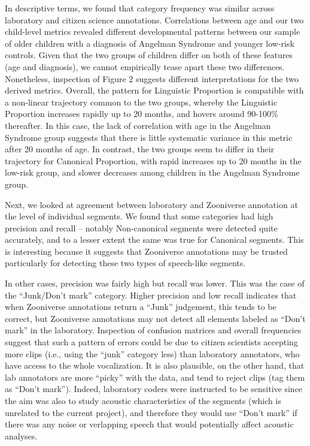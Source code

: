 \documentclass[english,,man,floatsintext]{apa6}
\begin{document}
In descriptive terms, we found that category frequency was similar across laboratory and citizen science annotations. Correlations between age and our two child-level metrics revealed different developmental patterns between our sample of older children with a diagnosis of Angelman Syndrome and younger low-risk controls. Given that the two groups of children differ on both of these features (age and diagnosis), we cannot empirically tease apart these two differences. Nonetheless, inspection of Figure 2 suggests different interpretations for the two derived metrics. Overall, the pattern for Linguistic Proportion is compatible with a non-linear trajectory common to the two groups, whereby the Linguistic Proportion increases rapidly up to 20 months, and hovers around 90-100\% thereafter. In this case, the lack of correlation with age in the Angelman Syndrome group suggests that there is little systematic variance in this metric after 20 months of age. In contrast, the two groups seem to differ in their trajectory for Canonical Proportion, with rapid increases up to 20 months in the low-risk group, and slower decreases among children in the Angelman Syndrome group.

Next, we looked at agreement between laboratory and Zooniverse annotation at the level of individual segments. We found that some categories had high precision and recall -- notably Non-canonical segments were detected quite accurately, and to a lesser extent the same was true for Canonical segments. This is interesting because it suggests that Zooniverse annotations may be trusted particularly for detecting these two types of speech-like segments.

In other cases, precision was fairly high but recall was lower. This was the case of the \enquote{Junk/Don't mark} category. Higher precision and low recall indicates that when Zooniverse annotations return a \enquote{Junk} judgement, this tends to be correct, but Zooniverse annotations may not detect all elements labeled as \enquote{Don't mark} in the laboratory. Inspection of confusion matrices and overall frequencies suggest that such a pattern of errors could be due to citizen scientists accepting more clips (i.e., using the \enquote{junk} category less) than laboratory annotators, who have access to the whole vocalization. It is also plausible, on the other hand, that lab annotators are more \enquote{picky} with the data, and tend to reject clips (tag them as \enquote{Don't mark}). Indeed, laboratory coders were instructed to be sensitive since the aim was also to study acoustic characteristics of the segments (which is unrelated to the current project), and therefore they would use \enquote{Don't mark} if there was any noise or verlapping speech that would potentially affect acoustic analyses.
\end{document}
